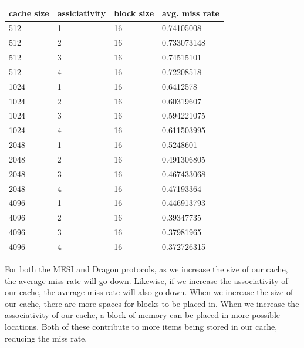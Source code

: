 \documentclass{article}
\begin{document}
\begin{table}[!ht]
    \centering
    \begin{tabular}{llll}
        \textbf{cache size} & \textbf{assiciativity} & \textbf{block size} & \textbf{avg. miss rate} \\ \hline
        512 & 1 & 16 & 0.74105008 \\
        512 & 2 & 16 & 0.733073148 \\
        512 & 3 & 16 & 0.74515101 \\
        512 & 4 & 16 & 0.72208518 \\
        1024 & 1 & 16 & 0.6412578 \\
        1024 & 2 & 16 & 0.60319607 \\
        1024 & 3 & 16 & 0.594221075 \\
        1024 & 4 & 16 & 0.611503995 \\
        2048 & 1 & 16 & 0.5248601 \\
        2048 & 2 & 16 & 0.491306805 \\
        2048 & 3 & 16 & 0.467433068 \\
        2048 & 4 & 16 & 0.47193364 \\
        4096 & 1 & 16 & 0.446913793 \\
        4096 & 2 & 16 & 0.39347735 \\
        4096 & 3 & 16 & 0.37981965 \\
        4096 & 4 & 16 & 0.372726315 \\
    \end{tabular}
\end{table}
For both the MESI and Dragon protocols, as we increase the size of our cache, the average miss rate will go down. Likewise, if we increase the associativity of our cache, the average miss rate will also go down. When we increase the size of our cache, there are more spaces for blocks to be placed in. When we increase the associativity of our cache, a block of memory can be placed in more possible locations. Both of these contribute to more items being stored in our cache, reducing the miss rate.
\end{document}
